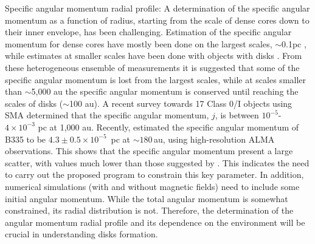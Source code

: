 Specific angular momentum radial profile: A determination of the specific angular momentum as a function of radius, starting from the scale of dense cores down to their inner envelope, has been challenging. 
Estimation of the specific angular momentum for dense cores have mostly been done on the largest scales, $\sim$0.1pc \citep{Goodman_1993,Caselli_2002}, while estimates at smaller scales have been done with objects with disks \citep[Class 0/I,][]{1997ApJ...488..317O,Yen_2015}. 
From these heterogeneous ensemble of measurements it is suggested \citep{Belloche_2013} that some of the specific angular momentum is lost from the largest scales, while at scales smaller than $\sim$5,000 au the specific angular momentum is conserved until reaching the scales of disks ($\sim$100 au). 
A recent survey towards 17 Class 0/I objects using SMA \citep{Yen_2015} determined that the specific angular momentum, $j$, is between $10^{-5}$-$4\times10^{-3}$ \kms pc at 1,000 au. 
Recently, \cite{2015arXiv150904675Y} estimated the specific angular momentum of B335 to be 
$4.3\pm 0.5\times 10^{-5}$ \kms\,pc at $\sim 180$\,au, using high-resolution ALMA observations.
%
This shows that the specific angular momentum present a large scatter, with values much lower than those suggested by \cite{Belloche_2013}. 
This indicates the need to carry out the proposed program to constrain this key parameter.
In addition, numerical simulations (with and without magnetic fields) need to include some initial angular momentum. 
While the total angular momentum is somewhat constrained, its radial distribution is not. 
Therefore, the determination of the angular momentum radial profile and its dependence on the environment will be crucial in understanding disks formation.

  
  
  
  